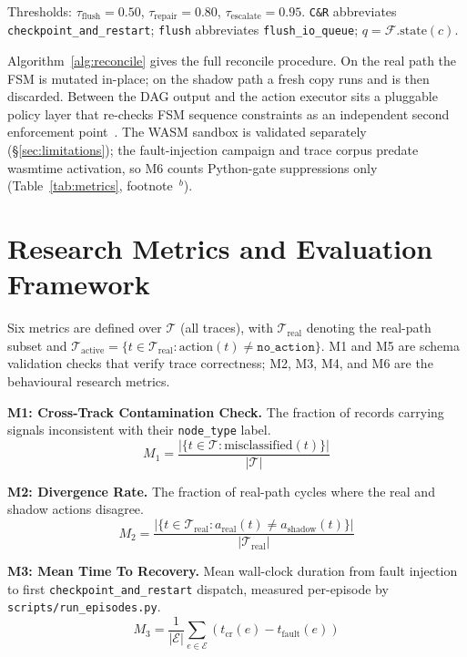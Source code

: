 \documentclass[conference]{IEEEtran}
\begin{document}
Thresholds: $\tau_{\mathrm{flush}} = 0.50$, $\tau_{\mathrm{repair}} = 0.80$, $\tau_{\mathrm{escalate}} = 0.95$. \texttt{C\&R} abbreviates \texttt{checkpoint\_and\_restart}; \texttt{flush} abbreviates \texttt{flush\_io\_queue}; $q = \mathcal{F}.\mathrm{state}(c)$.

Algorithm~\ref{alg:reconcile} gives the full reconcile procedure. On the real path the FSM is mutated in-place; on the shadow path a fresh copy runs and is then discarded. Between the DAG output and the action executor sits a pluggable policy layer that re-checks FSM sequence constraints as an independent second enforcement point~\cite{b4}. The WASM sandbox is validated separately (§\ref{sec:limitations}); the fault-injection campaign and trace corpus predate wasmtime activation, so M6 counts Python-gate suppressions only (Table~\ref{tab:metrics}, footnote~$^{b}$).

\section{Research Metrics and Evaluation Framework}
\label{sec:metrics}

Six metrics are defined over $\mathcal{T}$ (all traces), with $\mathcal{T}_{\mathrm{real}}$ denoting the real-path subset and $\mathcal{T}_{\mathrm{active}} = \{t \in \mathcal{T}_{\mathrm{real}} : \mathrm{action}(t) \neq \texttt{no\_action}\}$. M1 and M5 are schema validation checks that verify trace correctness; M2, M3, M4, and M6 are the behavioural research metrics.

\textbf{M1: Cross-Track Contamination Check.} The fraction of records carrying signals inconsistent with their \texttt{node\_type} label.
\begin{equation}
M_1 = \frac{|\{t \in \mathcal{T} : \mathrm{misclassified}(t)\}|}{|\mathcal{T}|}
\label{eq:M1}
\end{equation}

\textbf{M2: Divergence Rate.} The fraction of real-path cycles where the real and shadow actions disagree.
\begin{equation}
M_2 = \frac{|\{t \in \mathcal{T}_{\mathrm{real}} : a_{\mathrm{real}}(t) \neq a_{\mathrm{shadow}}(t)\}|}{|\mathcal{T}_{\mathrm{real}}|}
\label{eq:M2}
\end{equation}

\textbf{M3: Mean Time To Recovery.} Mean wall-clock duration from fault injection to first \texttt{checkpoint\_and\_restart} dispatch, measured per-episode by \texttt{scripts/run\_episodes.py}.
\begin{equation}
M_3 = \frac{1}{|\mathcal{E}|} \sum_{e \in \mathcal{E}} \!\left(t_{\mathrm{cr}}(e) - t_{\mathrm{fault}}(e)\right)
\label{eq:M3}
\end{equation}
\end{document}
